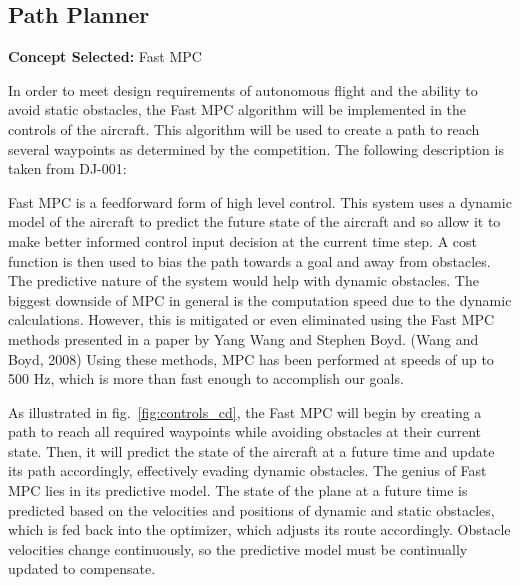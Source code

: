 
\begin{artifacttable}
\end{artifacttable}

\subsection{Path Planner}

\textbf{Concept Selected:} Fast MPC

In order to meet design requirements of autonomous flight and the ability to avoid static obstacles, the Fast MPC algorithm will be implemented in the controls of the aircraft. This algorithm will be used to create a path to reach several waypoints as determined by the competition. The following description is taken from DJ-001:

\begin{largequote}
Fast MPC is a feedforward form of high level control. This system uses a dynamic model of the aircraft to predict the future state of the aircraft and so allow it to make better informed control input decision at the current time step. A cost function is then used to bias the path towards a goal and away from obstacles. The predictive nature of the system would help with dynamic obstacles. The biggest downside of MPC in general is the computation speed due to the dynamic calculations. However, this is mitigated or even eliminated using the Fast MPC methods presented in a paper by Yang Wang and Stephen Boyd. (Wang and Boyd, 2008) Using these methods, MPC has been performed at speeds of up to 500 Hz, which is more than fast enough to accomplish our goals.
\end{largequote}

As illustrated in fig.~\ref{fig:controls_cd}, the Fast MPC will begin by creating a path to reach all required waypoints while avoiding obstacles at their current state. Then, it will predict the state of the aircraft at a future time and update its path accordingly, effectively evading dynamic obstacles. The genius of Fast MPC lies in its predictive model. The state of the plane at a future time is predicted based on the velocities and positions of dynamic and static obstacles, which is fed back into the optimizer, which adjusts its route accordingly. Obstacle velocities change continuously, so the predictive model must be continually updated to compensate.

